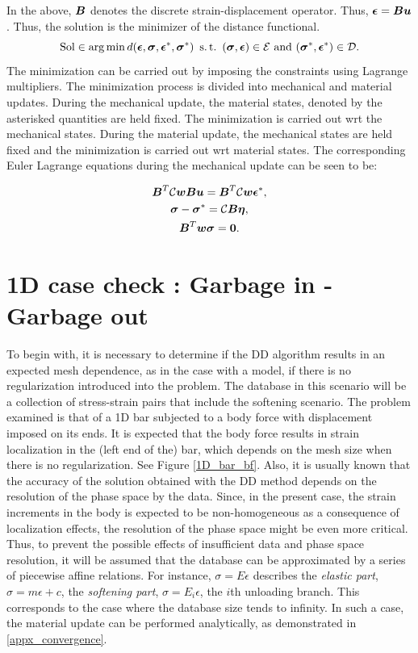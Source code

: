 \documentclass[11pt]{elsarticle}
\begin{document}
In the above, $\mbox{\boldmath $B$}$ denotes the discrete strain-displacement operator. Thus, $\mbox{\boldmath $\epsilon$} = \mbox{\boldmath $B$} \mbox{\boldmath $u$}$. Thus, the solution is the minimizer of the distance functional.
\begin{equation}
	\text{Sol} \in \arg \min d(\mbox{\boldmath $\epsilon$},\mbox{\boldmath $\sigma$},\mbox{\boldmath $\epsilon$}^*,\mbox{\boldmath $\sigma$}^*) \text{ } \operatorname{s.t.} \text{ } (\mbox{\boldmath $\sigma$} , \mbox{\boldmath $\epsilon$}) \in  \mathcal{E} \text{ and } (\mbox{\boldmath $\sigma$}^* , \mbox{\boldmath $\epsilon$}^*) \in  \mathcal{D}.
\end{equation}
The minimization can be carried out by imposing the constraints using Lagrange multipliers. The minimization process is divided into mechanical and material updates. During the mechanical update, the material states, denoted by the asterisked quantities are held fixed. The minimization is carried out wrt the mechanical states. During the material update, the mechanical states are held fixed and the minimization is carried out wrt material states.
The corresponding Euler Lagrange equations during the mechanical update can be seen to be:

\begin{gather}
	\mbox{\boldmath $B$}^T \mathcal{C}\mbox{\boldmath $w$} \mbox{\boldmath $B$} \mbox{\boldmath $u$} = \mbox{\boldmath $B$}^T \mathcal{C}\mbox{\boldmath $w$} \mbox{\boldmath $\epsilon$}^*, \\
	\mbox{\boldmath $\sigma$} - \mbox{\boldmath $\sigma$}^* =  \mathcal{C} \mbox{\boldmath $B$} \mbox{\boldmath $\eta$}, \\
	\mbox{\boldmath $B$}^T \mbox{\boldmath $w$}\mbox{\boldmath $\sigma$} = \mathbf{0}.
\end{gather}

\section{1D case check : Garbage in - Garbage out}
To begin with, it is necessary to determine if the DD algorithm results in an expected mesh dependence, as in the case with a model, if there is no regularization introduced into the problem. The database in this scenario will be a collection of stress-strain pairs that include the softening scenario. The problem examined is that of a 1D bar subjected to a body force with displacement imposed on its ends. It is expected that the body force results in strain localization in the (left end of the) bar, which depends on the mesh size when there is no regularization. See Figure \ref{1D_bar_bf}. Also, it is usually known that the accuracy of the solution obtained with the DD method depends on the resolution of the phase space by the data. Since, in the present case, the strain increments in the body is expected to be non-homogeneous as a consequence of localization effects, the resolution of the phase space might be even more critical. Thus, to prevent the possible effects of insufficient data and phase space resolution, it will be assumed that the database can be approximated by a series of piecewise affine relations. For instance, $\sigma=E \epsilon$ describes the \textit{elastic part}, $\sigma = m\epsilon + c$, the \textit{softening part}, $\sigma = E_i \epsilon$, the $i$th unloading branch. This corresponds to the case where the database size tends to infinity. In such a case, the material update can be performed analytically, as demonstrated in \ref{appx_convergence}. 
\end{document}
